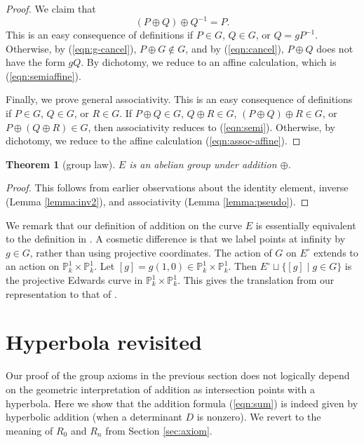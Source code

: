 \documentclass[12pt]{article}
\newtheorem{theorem}{Theorem}[subsection]
\newcommand{\ring}[1]{\mathbb{#1}}
\newcommand{\Eoo}{E^{\circ}}
\newcommand{\hplus}{\oplus}
\begin{document}
\begin{proof}
We claim that
\begin{equation}\label{eqn:semi}
(P\oplus Q)\oplus Q^{-1} = P.
\end{equation}
This is an easy consequence of definitions if $P\in G$, $Q\in G$, or
$Q = gP^{-1}$.  Otherwise, by (\ref{eqn:g-cancel}), $P\oplus G\not\in
G$, and by (\ref{eqn:cancel}), $P\oplus Q$ does not have the form $g
Q$.  By dichotomy, we reduce to an affine calculation, which is
(\ref{eqn:semiaffine}).

Finally, we prove general associativity.  This is an easy consequence
of definitions if $P\in G$, $Q\in G$, or $R\in G$.  If $P\oplus Q\in
G$, $Q\oplus R\in G$, $(P\oplus Q)\oplus R\in G$, or $P\oplus (Q\oplus
R)\in G$, then associativity reduces to (\ref{eqn:semi}).  Otherwise,
by dichotomy, we reduce to the affine calculation
(\ref{eqn:assoc-affine}).
\end{proof}

\begin{theorem}[group law] $E$ is an abelian group under addition $\hplus$.
\end{theorem}

\begin{proof} This follows from earlier observations about the
  identity element, inverse (Lemma \ref{lemma:inv2}), and
  associativity (Lemma \ref{lemma:pseudo}).
\end{proof}

We remark that our definition of addition on the curve $E$ is
essentially equivalent to the definition in
\cite{bernstein2011complete}.  A cosmetic difference is that we label
points at infinity by $g\in G$, rather than using projective
coordinates.  The action of $G$ on $\Eoo$ extends to an action on
$\ring{P}^1_k\times \ring{P}^1_k$.  Let $[g] = g (1,0)\in
\ring{P}^1_k\times \ring{P}^1_k$.  Then $\Eoo\sqcup \{[g]\mid g\in
G\}$ is the projective Edwards curve in $\ring{P}^1_k\times \ring{P}^1_k$.
This gives the translation from our representation to that of
\cite{bernstein2011complete}.

\section{Hyperbola revisited}

Our proof of the group axioms in the previous section does not
logically depend on the geometric interpretation of addition as
intersection points with a hyperbola.  Here we show that the addition
formula (\ref{eqn:sum}) is indeed given by hyperbolic addition (when a
determinant $D$ is nonzero).  We revert to the meaning of $R_0$ and
$R_n$ from Section \ref{sec:axiom}.
\end{document}
